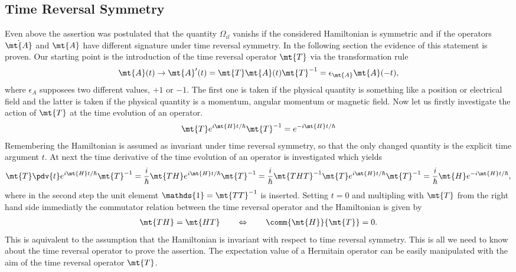 \subsection{Time Reversal Symmetry}
\label{subsec: time reversal symmetry}
%
%
Even above the assertion was postulated that the quantity $\Omega_{il}$ vanishs if the considered Hamiltonian is symmetric and if the operators $\dot{\mt{A}}$ and $\mt{A}$ have different signature under time reversal symmetry.
In the following section the evidence of this statement is proven.
Our starting point is the introduction of the time reversal operator $\mt{T}$ via the transformation rule
%
\begin{align}
	\mt{A}(t) \to \mt{A}'(t) = \mt{T} \mt{A}(t) \mt{T}^{-1} = \epsilon_{\mt{A}} \mt{A}(-t),
\end{align}
%
where $\epsilon_{A}$ supposees two different values, $+1$ or $-1$.
The first one is taken if the physical quantity is something like a position or electrical field and the latter is taken if the physical quantity is a momentum, angular momentum or magnetic field.
Now let us firstly investigate the action of $\mt{T}$ at the time evolution of an operator.
%
\begin{align}
	\mt{T} e^{i\mt{H}t/\hbar} \mt{T}^{-1} = e^{-i\mt{H}t/\hbar}
\end{align}
%
Remembering the Hamiltonian is assumed as invariant under time reversal symmetry, so that the only changed quantity is the explicit time argument $t$.
At next the time derivative of the time evolution of an operator is investigated which yields
%
\begin{align}
	\mt{T} \pdv{t} e^{i\mt{H}t/\hbar} \mt{T}^{-1} = \frac{i}{\hbar} \mt{TH} e^{i\mt{H}t/\hbar} \mt{T}^{-1} = \frac{i}{\hbar} \mt{THT}^{-1} \mt{T} e^{i\mt{H}t/\hbar} \mt{T}^{-1} = \frac{i}{\hbar} \mt{H} e^{-i\mt{H}t/\hbar},
\end{align}
%
where in the second step the unit elememt $\mathds{1} = \mt{TT}^{-1}$ is inserted.
Setting $t = 0$ and multipling with $\mt{T}$ from the right hand side immediatly the commutator relation between the time reversal operator and the Hamiltonian is given by
%
\begin{align}	
	\mt{TH} = \mt{HT} \qquad \Leftrightarrow \qquad \comm{\mt{H}}{\mt{T}} = 0.
\end{align}
%
This is aquivalent to the assumption that the Hamiltonian is invariant with respect to time reversal symmetry.
This is all we need to know about the time reversal operator to prove the assertion.
The expectation value of a Hermitain operator can be easily manipulated with the aim of the time reversal operator $\mt{T}$.
